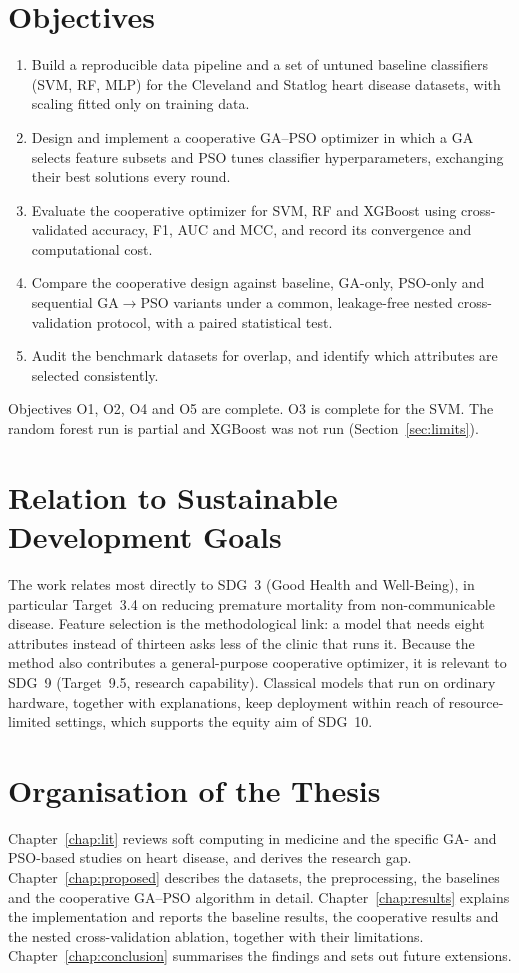 \documentclass[MTech]{ugthesis}
\begin{document}
\section{Objectives}
\label{sec:objectives}
\begin{enumerate}
\item[O1] Build a reproducible data pipeline and a set of untuned baseline classifiers (SVM, RF, MLP) for the Cleveland and Statlog heart disease datasets, with scaling fitted only on training data.
\item[O2] Design and implement a cooperative GA--PSO optimizer in which a GA selects feature subsets and PSO tunes classifier hyperparameters, exchanging their best solutions every round.
\item[O3] Evaluate the cooperative optimizer for SVM, RF and XGBoost using cross-validated accuracy, F1, \ac{AUC} and \ac{MCC}, and record its convergence and computational cost.
\item[O4] Compare the cooperative design against baseline, GA-only, PSO-only and sequential GA$\rightarrow$PSO variants under a common, leakage-free nested cross-validation protocol, with a paired statistical test.
\item[O5] Audit the benchmark datasets for overlap, and identify which attributes are selected consistently.
\end{enumerate}
Objectives O1, O2, O4 and O5 are complete. O3 is complete for the SVM. The random forest run is partial and XGBoost was not run (Section~\ref{sec:limits}).

\section{Relation to Sustainable Development Goals}
The work relates most directly to \ac{SDG}~3 (Good Health and Well-Being), in particular Target~3.4 on reducing premature mortality from non-communicable disease. Feature selection is the methodological link: a model that needs eight attributes instead of thirteen asks less of the clinic that runs it. Because the method also contributes a general-purpose cooperative optimizer, it is relevant to SDG~9 (Target~9.5, research capability). Classical models that run on ordinary hardware, together with explanations, keep deployment within reach of resource-limited settings, which supports the equity aim of SDG~10.

\section{Organisation of the Thesis}
Chapter~\ref{chap:lit} reviews soft computing in medicine and the specific GA- and PSO-based studies on heart disease, and derives the research gap. Chapter~\ref{chap:proposed} describes the datasets, the preprocessing, the baselines and the cooperative GA--PSO algorithm in detail. Chapter~\ref{chap:results} explains the implementation and reports the baseline results, the cooperative results and the nested cross-validation ablation, together with their limitations. Chapter~\ref{chap:conclusion} summarises the findings and sets out future extensions.
\end{document}

